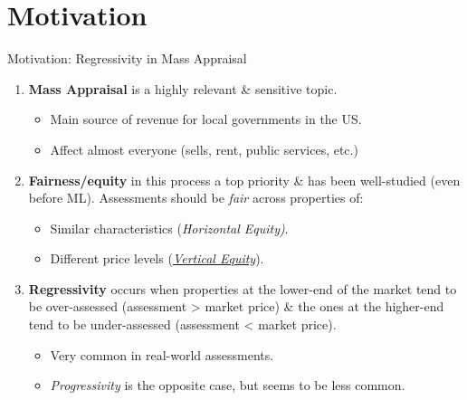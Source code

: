 \documentclass[aspectratio=169,10pt]{beamer}
\begin{document}



\newcommand{\sectionName}{Motivation}
\section{\sectionName}

\newcommand{\frameZ}{Motivation: Regressivity in Mass Appraisal}
\begin{frame}{\frameZ}
    \begin{enumerate}
        \item \textbf{Mass Appraisal} is a highly relevant \& sensitive topic. 
        
    \begin{itemize}
        \item Main source of revenue for local governments in the US.
        \item Affect almost everyone (sells, rent, public services, etc.)
    \end{itemize}
    \medskip
    \item \textbf{Fairness/equity} in this process a top priority \& has been well-studied (even before ML). Assessments should be \textit{fair} across properties of:
    \begin{itemize}
        \item Similar characteristics (\textit{Horizontal Equity)}. 
        \item Different price levels (\underline{\textit{Vertical Equity}}). 
    \end{itemize}
    \medskip
    \item \textbf{Regressivity} occurs when properties at the lower-end of the market tend to be over-assessed (assessment > market price) \&  the ones at the higher-end tend to be under-assessed (assessment < market price).
    \begin{itemize}
        \item Very common in real-world assessments.
        \item \textit{Progressivity} is the opposite case, but seems to be less common.
    \end{itemize}
    \end{enumerate}

\end{frame}
\end{document}
